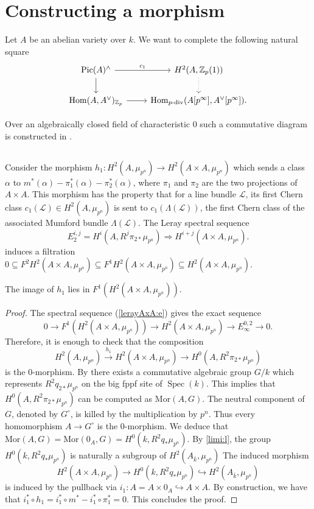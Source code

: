 \documentclass[11pt]{amsart}
\newcommand{\kbar}{{\bar{k}}}
\newcommand{\Zp}{{\mathbb{Z}_{p}}}
\newcommand{\calL}{\mathcal{L}}
\DeclareMathOperator{\Spec}{Spec}
\DeclareMathOperator{\Hom}{Hom}
\newcommand{\Pic}{\mathrm{Pic}}
\newcommand{\Mor}{\mathrm{Mor}}
\newcommand{\mupn}{{\mu_{p^n}}}
\begin{document}
\section{Constructing a morphism}\label{cons-morp:s}
\label{cons-a-morp:s}
Let $A$ be an abelian variety over $k$. We want to complete the following natural square
	\begin{equation*}
	\begin{tikzcd}\Pic(A)^\wedge\arrow[r,"c_1"]\arrow[d] & H^2(A,\Zp(1))\arrow[d,dotted]\\
		\Hom(A,A^\vee)_{\Zp}\arrow[r] & \Hom_{p\textrm{-div}}(A[p^\infty],A^\vee[p^\infty]).
	\end{tikzcd}
\end{equation*}	

Over an algebraically closed field of characteristic $0$ such a commutative diagram is constructed in \cite[Lem. 2.6]{OSZ21}.

\subsection{}
	Consider the morphism $h_1:H^2(A,\mupn)\to H^2(A\times A,\mupn)$ which sends a class $\alpha$ to $m^*(\alpha)-\pi_1^*(\alpha)-\pi_2^*(\alpha)$, where $\pi_1$ and $\pi_2$ are the two projections of $A\times A$. This morphism has the property that for a line bundle $\calL$, its first Chern class $c_1(\calL)\in H^2(A,\mupn)$ is sent to $c_1(\Lambda(\calL))$, the first Chern class of the associated Mumford bundle $\Lambda(\calL)$. The Leray spectral sequence
\begin{equation}\label{lerayAxA:e}
	E^{i,j}_2=H^i(A,R^j\pi_{2*}\mupn)\Rightarrow H^{i+j}(A\times A,\mupn).
\end{equation}
induces a filtration $0\subseteq F^2 H^{2}(A\times A,\mupn) \subseteq F^1 H^{2}(A\times A,\mupn)\subseteq H^{2}(A\times A,\mupn) $.
\begin{lemm}\label{image:l}The image of $h_1$ lies in $F^1(H^{2}(A\times A,\mupn))$.
\end{lemm}
\begin{proof}
The spectral sequence (\ref{lerayAxA:e}) gives the exact sequence $$0\to F^1(H^{2}(A\times A,\mupn))\to H^{2}(A\times A,\mupn)\to E^{0,2}_\infty\to 0.$$ Therefore, it is enough to check that the composition $$H^2(A,\mupn)\xrightarrow{h_1} H^2(A\times A,\mupn)\to H^0(A,R^2\pi_{2*}\mupn)$$ is the $0$-morphism. By \cite{BO21} there exists a commutative algebraic group $G/k$ which represents $R^2q_{2*}\mupn$ on the big fppf site of $\Spec(k)$. This implies that $H^0(A,R^2\pi_{2*}\mupn)$ can be computed as $\Mor(A,G).$ The neutral component of $G$, denoted by $G^\circ$, is killed by the multiplication by $p^n$. Thus every homomorphism $A\to G^\circ$ is the $0$-morphism. We deduce that $\Mor(A,G)=\Mor(0_A,G)=H^0(k,R^2q_{*}\mupn)$. By \ref{limi:l}, the group $H^0(k,R^2q_{*}\mupn)$ is naturally a subgroup of $H^2(A_\kbar,\mupn)$ The induced morphism $$H^2(A\times A,\mupn)\to H^0(k,R^2q_{*}\mupn)\hookrightarrow H^2(A_\kbar,\mupn)$$ is induced by the pullback via $i_1:A=A\times 0_A \hookrightarrow A\times A$. By construction, we have that $i_1^*\circ h_1=i_1^*\circ m^*-i_1^*\circ \pi_1^*=0$. This concludes the proof.
\end{proof}
\end{document}
